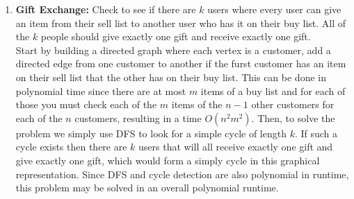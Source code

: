 \documentclass[12pt]{elsart}
\begin{document}
\begin{enumerate}
  \item {\bf Gift Exchange:} Check to see if there are $k$ users where every user can give an item from their sell list to another user who has it on their buy list.  All of the $k$ people should give exactly one gift and receive exactly one gift.\\
  Start by building a directed graph where each vertex is a customer, add a directed edge from one customer to another if the furst customer has an item on their sell list that the other has on their buy list. This can be done in polynomial time since there are at most $m$ items of a buy list and for each of those you must check each of the $m$ items of the $n - 1$ other customers for each of the $n$ customers, resulting in a time $O(n^2m^2)$. Then, to solve the problem we simply use DFS to look for a simple cycle of length $k$. If such a cycle exists then there are $k$ users that will all receive exactly one gift and give exactly one gift, which would form a simply cycle in this graphical representation. Since DFS and cycle detection are also polynomial in runtime, this problem may be solved in an overall polynomial runtime.
\end{enumerate}


\end{document}

